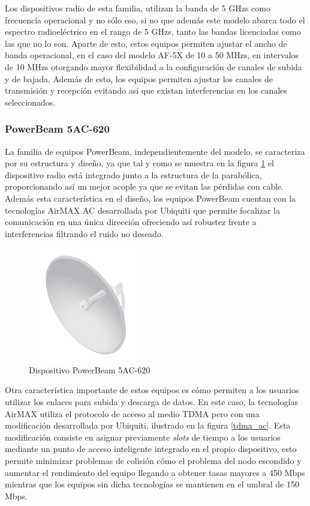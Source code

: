  Los dispositivos radio de esta familia, utilizan la banda de 5 GHzs como frecuencia operacional y no sólo eso, si no que además este modelo abarca todo el espectro radioeléctrico en el rango de 5 GHzs, tanto las bandas licenciadas como las que no lo son. Aparte de esto, estos equipos permiten ajustar el ancho de banda operacional, en el caso del modelo AF-5X de 10 a 50 MHzs, en intervalos de 10 MHzs otorgando mayor flexibilidad a la configuración de canales de subida y de bajada. Además de esto, los equipos permiten ajustar los canales de transmisión y recepción evitando así que existan interferencias en los canales seleccionados.
	
\subsubsection{PowerBeam 5AC-620}
La familia de equipos PowerBeam, independientemente del modelo, se caracteriza por su estructura y diseño, ya que tal y como se muestra en la figura \ref{powerBeam} el dispositivo radio está integrado junto a la estructura de la parabólica, proporcionando así un mejor acople ya que se evitan las pérdidas con cable. Además esta característica en el diseño, los equipos PowerBeam cuentan con la tecnologías AirMAX AC desarrollada por Ubiquiti que permite focalizar la comunicación en una única dirección ofreciendo así robustez frente a interferencias filtrando el ruido no deseado.

\begin{figure}[H]
		\centering
		\includegraphics[width=5cm,height=5cm]{img/powerbeam.PNG}
		\caption{Dispositivo PowerBeam 5AC-620}
		\label{powerBeam}
\end{figure}

Otra característica importante de estos equipos es cómo permiten a los usuarios utilizar los enlaces para subida y descarga de datos. En este caso, la tecnologías AirMAX utiliza el protocolo de acceso al medio TDMA pero con una modificación desarrollada por Ubiquiti, ilustrado en la figura \ref{tdma_ac}. Esta modificación consiste en asignar previamente \textit{slots} de tiempo a los usuarios mediante un punto de acceso inteligente integrado en el propio dispositivo, esto permite minimizar problemas de colisión cómo el problema del nodo escondido y aumentar el rendimiento del equipo llegando a obtener tasas mayores a 450 Mbps mientras que los equipos sin dicha tecnologías se mantienen en el umbral de 150 Mbps.
	
